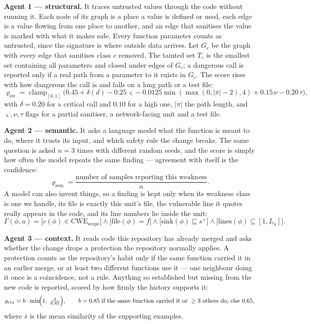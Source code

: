 \documentclass[9pt,journal,onecolumn]{IEEEtran}
\newcommand{\clampop}{\operatorname{clamp}}
\begin{document}
\vspace{-2pt}
\noindent\textbf{Agent 1 --- structural.} It traces untrusted values through the code without running
it. Each node of its graph is a place a value is defined or used, each edge is a value flowing from
one place to another, and an edge that sanitises the value is marked with what it makes safe. Every
function parameter counts as untrusted, since the signature is where outside data arrives. Let $G_c$
be the graph with every edge that sanitises class $c$ removed. The tainted set $T_c$ is the smallest
set containing all parameters and closed under edges of $G_c$; a dangerous call is reported only if a
real path from a parameter to it exists in $G_c$. The score rises with how dangerous the call is and
falls on a long path or a test file:
\begin{equation}
\varrho_{\mathrm{str}}=\clampop_{[0,1]}\!\bigl(0.45+\delta(d)-0.25\,\varsigma-0.0125\min(\max(0,|\pi|-2),4)+0.15\,\nu-0.20\,\tau\bigr),
\end{equation}
with $\delta=0.20$ for a critical call and $0.10$ for a high one, $|\pi|$ the path length, and
$\varsigma,\nu,\tau$ flags for a partial sanitiser, a network-facing unit and a test file.

\noindent\textbf{Agent 2 --- semantic.} It asks a language model what the function is meant to do,
where it trusts its input, and which safety rule the change breaks. The same question is asked $n=3$
times with different random seeds, and the score is simply how often the model repeats the same
finding --- agreement with itself is the confidence:
\begin{equation}
\varrho_{\mathrm{sem}}=\frac{\text{number of samples reporting this weakness}}{n}.
\end{equation}
A model can also invent things, so a finding is kept only when its weakness class is one we handle,
its file is exactly this unit's file, the vulnerable line it quotes really appears in the code, and
its line numbers lie inside the unit:
\begin{equation}
\Gamma(\phi,u)=\bigl[c(\phi)\in\text{CWE}_{\text{scope}}\bigr]\wedge\bigl[\text{file}(\phi)=f\bigr]\wedge\bigl[\text{sink}(\phi)\sqsubseteq s^{+}\bigr]\wedge\bigl[\text{lines}(\phi)\subseteq[1,L_u]\bigr].
\end{equation}

\noindent\textbf{Agent 3 --- context.} It reads code this repository has already merged and asks
whether the change drops a protection the repository normally applies. A protection counts as the
repository's habit only if the same function carried it in an earlier merge, or at least two different
functions use it --- one neighbour doing it once is a coincidence, not a rule. Anything so established
but missing from the new code is reported, scored by how firmly the history supports it:
\begin{equation}
\varrho_{\mathrm{ctx}}=b\cdot\min\!\Bigl(1,\ \tfrac{\bar{s}}{0.85}\Bigr), \qquad
b=0.85 \text{ if the same function carried it or } \ge 3 \text{ others do, else } 0.65,
\end{equation}
where $\bar{s}$ is the mean similarity of the supporting examples.
\end{document}
